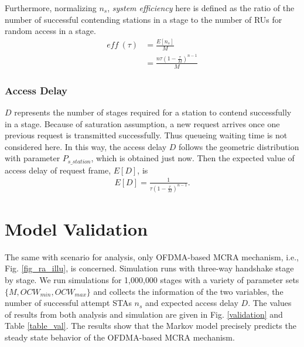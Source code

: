 \documentclass[journal]{IEEEtran}
\begin{document}
Furthermore, normalizing $n_s$, \textit{system efficiency} here is defined as the ratio of the number of successful contending stations in a stage to the number of RUs for random access in a stage.
\begin{align}
\label{eff_def}
\textit{eff}\ (\tau) &=\frac{E[n_s]}{M} \nonumber \\
					 &= \frac{n\tau(1-\frac{\tau}{M})^{n-1}}{M}
\end{align}


	
\subsubsection{Access Delay}
$D$ represents the number of stages required for a station to contend successfully in a stage. 
Because of saturation assumption, a new request arrives once one previous request is transmitted successfully.
Thus queueing waiting time is not considered here. 
In this way, the access delay $D$ follows the geometric distribution with parameter $P_{s\_station}$, which is obtained just now.  
Then the expected value of access delay of request frame, $E[D]$, is 
\begin{align}
\label{equ_delay}
E[D] = \frac{1}{\tau (1-\frac{\tau}{M})^{n-1}}.
\end{align}




\section{Model Validation} 		\label{sec_model_val}
The same with scenario for analysis, only OFDMA-based MCRA mechanism, i.e., Fig. \ref{fig_ra_illu}, is concerned.
Simulation runs with three-way handshake stage by stage.
We run simulations for 1,000,000 stages with a variety of parameter sets $\lbrace M, OCW_{min}, OCW_{max}\rbrace$ and collects the information of the two variables, the number of successful attempt STAs $n_s$ and expected access delay $D$. 
The values of results from both analysis and simulation are given in Fig. \ref{validation} and Table \ref{table_val}. 
The results show that the Markov model precisely predicts the steady state behavior of the OFDMA-based MCRA mechanism.
\end{document}
